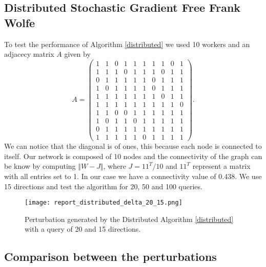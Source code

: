 \subsection{Distributed Stochastic Gradient Free Frank Wolfe}
To test the performance of Algorithm \ref{distributed} we used 10 workers and an adjacecy matrix $A$ given by 
\[ A = 
\begin{pmatrix}
1& 1& 0& 1& 1& 1& 1& 1& 0& 1\\
1& 1& 1& 0& 1& 1& 1& 0& 1& 1\\
0& 1& 1& 1& 1& 1& 0& 1& 1& 1\\
1& 0& 1& 1& 1& 1& 0& 1& 1& 1\\
1& 1& 1& 1& 1& 1& 1& 0& 1& 1\\
1& 1& 1& 1& 1& 1& 1& 1& 1& 0\\
1& 1& 0& 0& 1& 1& 1& 1& 1& 1\\
1& 0& 1& 1& 0& 1& 1& 1& 1& 1\\
0& 1& 1& 1& 1& 1& 1& 1& 1& 1\\
1& 1& 1& 1& 1& 0& 1& 1& 1& 1	
\end{pmatrix}
.\]
We can notice that the diagonal is of ones, this because each node is connected to itself. Our network is composed of 10 nodes and the connectivity of the graph can be know by computing $\Vert W- J \Vert$, where $J= 11^T/10$ and $11^T$ represent a matrix with all entries set to 1. In our case we have a connectivity value of 0.438. We use 15 directions and test the algorithm for 20, 50 and 100 queries.

\begin{figure}[htbp]
	\centering
	\texttt{[image: report\_distributed\_delta\_20\_15.png]}
	\caption{Perturbation generated by the Distributed Algorithm \ref{distributed} with a query of 20 and 15 directions.}
	\label{fig:variance-reduced}
\end{figure}

\subsection{Comparison between the perturbations}
